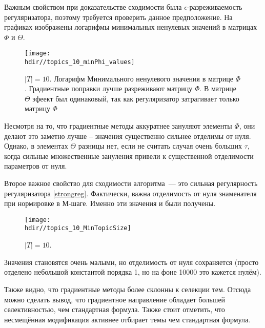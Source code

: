 \documentclass[12pt, twoside]{article}
\newcommand{\hdir}{.}
\begin{document}
Важным свойством при доказательстве сходимости была $\epsilon$-разреживаемость регуляризатора, поэтому требуется проверить данное предположение. На графиках изображены логарифмы минимальных ненулевых значений в матрицах $\Phi$ и $\Theta$.
\begin{figure}[!ht]
	\centering
	\texttt{[image: \\hdir//topics\_10\_minPhi\_values]}
	\caption{$|T| = 10$. Логарифм Минимального ненулевого значения в матрице $\Phi$. Градиентные поправки лучше разреживают матрицу $\Phi$. В матрице $\Theta$ эфеект был одинаковый, так как регуляризатор затрагивает только матрицу $\Phi$}    
\end{figure}
Несмотря на то, что градиентные методы аккуратнее  зануляют элементы $\Phi$, они делают это заметно лучше -- значения существенно сильнее отделимы от нуля. Однако, в элементах $\Theta$ разницы нет, если не считать случая очень больших $\tau$, когда сильные множественные зануления привели к существенной отделимости параметров от нуля.

Второе важное свойство для сходимости алгоритма~--- это сильная регулярность регуляризатора \ref{strongreg}. Фактически, важна отделимость от нуля знаменателя при нормировке в М-шаге. Именно эти значения  и были получены.

\begin{figure}[!ht]
	\centering
	\caption{$|T| = 10$.}    
	\texttt{[image: \\hdir//topics\_10\_MinTopicSize]}
\end{figure}

Значения становятся очень малыми, но отделимость от нуля сохраняется (просто отделено небольшой константой порядка 1, но на фоне 10000 это кажется нулём). 

Также видно, что градиентные методы более склонны к селекции тем. Отсюда можно сделать вывод, что градиентное направление обладает большей селективностью, чем стандартная формула. Также стоит отметить, что несмещённая модификация активнее отбирает темы чем стандартная формула.
\end{document}
